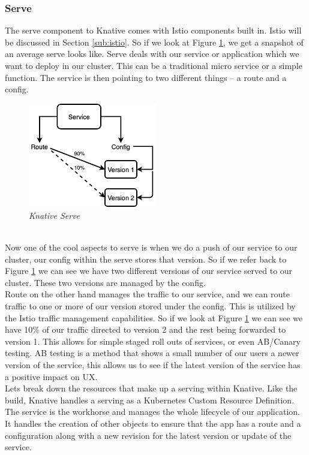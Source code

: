 \subsubsection{Serve}
The serve component to Knative comes with Istio components built in. Istio will be discussed in Section \ref{sub:istio}. So if we look at Figure \ref{img:knative-serve}, we get a snapshot of an average serve looks like. Serve deals with our service or application which we want to deploy in our cluster. This can be a traditional micro service or a simple function. The service is then pointing to two different things -- a route and a config.
\begin{figure}[!ht]
\centering
\includegraphics*[width=0.5\textwidth]{images/knative-serve.png}
\caption{\em Knative Serve}
\label{img:knative-serve}
\end{figure}
\\Now one of the cool aspects to serve is when we do a push of our service to our cluster, our config within the serve stores that version. So if we refer back to Figure \ref{img:knative-serve} we can see we have two different versions of our service served to our cluster. These two versions are managed by the config. 
\\Route on the other hand manages the traffic to our service, and we can route traffic to one or more of our version stored under the config. This is utilized by the Istio traffic management capabilities. So if we look at Figure \ref{img:knative-serve} we can see we have 10\% of our traffic directed to version 2 and the rest being forwarded to version 1. This allows for simple staged roll outs of services, or even AB/Canary testing. AB testing is a method that shows a small number of our users a newer version of the service, this allows us to see if the latest version of the service has a positive impact on UX.
\\Lets break down the resources that make up a serving within Knative. Like the build, Knative handles a serving as a Kubernetes Custom Resource Definition. The service is the workhorse and manages the whole lifecycle of our application. It handles the creation of other objects to ensure that the app has a route and a configuration along with a new revision for the latest version or update of the service. 
